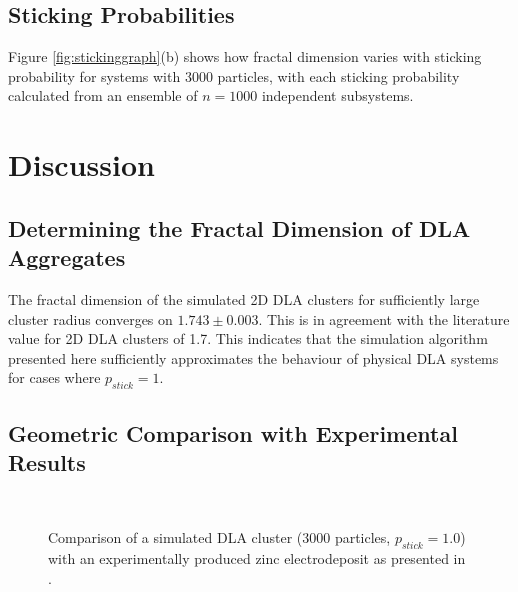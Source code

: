 \documentclass[11pt]{iopart}
\begin{document}
\subsection{Sticking Probabilities}
Figure \ref{fig:stickinggraph}(b) shows how fractal dimension varies with sticking probability for systems with 3000 particles, with each sticking probability calculated from an ensemble of $n=1000$ independent subsystems.

\section{Discussion}
\subsection{Determining the Fractal Dimension of DLA Aggregates}

The fractal dimension of the simulated 2D DLA clusters for sufficiently large cluster radius converges on $1.743 \pm 0.003$. This is in agreement with the literature value for 2D DLA clusters of 1.7\cite{fractalindexref}. This indicates that the simulation algorithm presented here sufficiently approximates the behaviour of physical DLA systems for cases where $p_{stick} = 1$.

\subsection{Geometric Comparison with Experimental Results}

\begin{figure}[t]
    \centering
    \quad \quad \quad \quad \quad \quad \quad
     \\
 
    \caption{Comparison of a simulated DLA cluster (3000 particles, $p_{stick} = 1.0$) with an experimentally produced zinc electrodeposit as presented in \cite{dla}.}
    \label{fig:realcrystal}
\end{figure}
\end{document}
